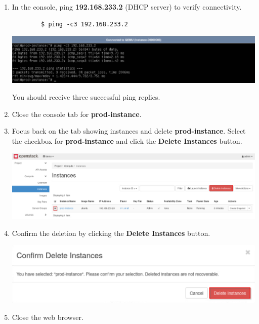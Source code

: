 \documentclass[letterpaper, 12pt]{article}
\begin{document}
\begin{enumerate}
    \item In the console, ping \textbf{192.168.233.2} (DHCP server) to verify connectivity.
    \begin{lstlisting}
        $ ping -c3 192.168.233.2
    \end{lstlisting}

    \begin{center}
        \includegraphics[width=\linewidth]{images/part1/step14.png}
    \end{center}

    \begin{notebox}
        You should receive three successful ping replies.
    \end{notebox}

    \item Close the console tab for \textbf{prod-instance}.

    \item Focus back on the tab showing instances and delete \textbf{prod-instance}.
    Select the checkbox for \textbf{prod-instance} and click the \textbf{Delete Instances} button.

    \begin{center}
        \includegraphics[width=\linewidth]{images/part1/step16.png}
    \end{center}

    \item Confirm the deletion by clicking the \textbf{Delete Instances} button.

    \begin{center}
        \includegraphics[width=\linewidth]{images/part1/step17.png}
    \end{center}

    \item Close the web browser.
\end{enumerate}
\end{document}
